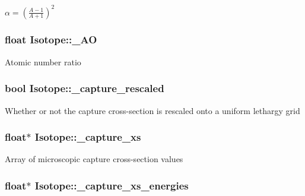 $ \alpha = \left(\frac{A-1}{A+1}\right)^2$ \hypertarget{classIsotope_a73170c5a731744a3579daa7f12c72a16}{
\subsubsection[{\-\_\-\-A\-O}]{\setlength{\rightskip}{0pt plus 5cm}float Isotope\-::\-\_\-\-A\-O\hspace{0.3cm}{\ttfamily [private]}}}\label{classIsotope_a73170c5a731744a3579daa7f12c72a16}
Atomic number ratio \hypertarget{classIsotope_ac5443613ba3bc171c871055ac6098265}{
\subsubsection[{\-\_\-capture\-\_\-rescaled}]{\setlength{\rightskip}{0pt plus 5cm}bool Isotope\-::\-\_\-capture\-\_\-rescaled\hspace{0.3cm}{\ttfamily [private]}}}\label{classIsotope_ac5443613ba3bc171c871055ac6098265}
Whether or not the capture cross-\/section is rescaled onto a uniform lethargy grid \hypertarget{classIsotope_a1d39f52d0c845a1c9d86b367aa987e6a}{
\subsubsection[{\-\_\-capture\-\_\-xs}]{\setlength{\rightskip}{0pt plus 5cm}float$\ast$ Isotope\-::\-\_\-capture\-\_\-xs\hspace{0.3cm}{\ttfamily [private]}}}\label{classIsotope_a1d39f52d0c845a1c9d86b367aa987e6a}
Array of microscopic capture cross-\/section values \hypertarget{classIsotope_a50e63730ff55e52239de9a4f0e3e865c}{
\subsubsection[{\-\_\-capture\-\_\-xs\-\_\-energies}]{\setlength{\rightskip}{0pt plus 5cm}float$\ast$ Isotope\-::\-\_\-capture\-\_\-xs\-\_\-energies\hspace{0.3cm}{\ttfamily [private]}}}\label{classIsotope_a50e63730ff55e52239de9a4f0e3e865c}
